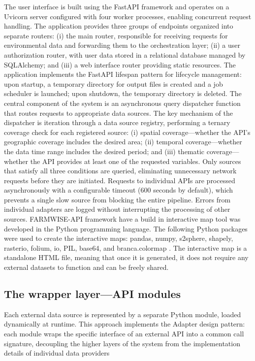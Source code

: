 \documentclass[preprint,12pt,authoryear]{elsarticle}
\begin{document}
The user interface is built using the FastAPI framework and operates on a Uvicorn server configured with four worker processes, enabling concurrent request handling. The application provides three groups of endpoints organized into separate routers: (i) the main router, responsible for receiving requests for environmental data and forwarding them to the orchestration layer; (ii) a user authorization router, with user data stored in a relational database managed by SQLAlchemy; and (iii) a web interface router providing static resources. The application implements the FastAPI lifespan pattern for lifecycle management: upon startup, a temporary directory for output files is created and a job scheduler is launched; upon shutdown, the temporary directory is deleted.
The central component of the system is an asynchronous query dispatcher function that routes requests to appropriate data sources. The key mechanism of the dispatcher is iteration through a data source registry, performing a ternary coverage check for each registered source: (i) spatial coverage—whether the API's geographic coverage includes the desired area; (ii) temporal coverage—whether the data time range includes the desired period; and (iii) thematic coverage—whether the API provides at least one of the requested variables. Only sources that satisfy all three conditions are queried, eliminating unnecessary network requests before they are initiated. Requests to individual APIs are processed asynchronously with a configurable timeout (600 seconds by default), which prevents a single slow source from blocking the entire pipeline. Errors from individual adapters are logged without interrupting the processing of other sources.
FARMWISE-API framework have a build in interactive map tool was developed in the Python programming language. The following Python packages were used to create the interactive maps: pandas, numpy, s2sphere, shapely, rasterio, folium, io, PIL, base64, and branca.colormap \citep{foliumteam2025,Gillies2025,pandasdevelopmentteam2024,Rougier2015,s2spheredevelopmentteam2025, Rasteriodevelopmentteam2025,PythonTeam2025}. The interactive map is a standalone HTML file, meaning that once it is generated, it does not require any external datasets to function and can be freely shared.

\subsection{The wrapper layer—API modules}
\label{Meth:sub1}

Each external data source is represented by a separate Python module, loaded dynamically at runtime. This approach implements the Adapter design pattern: each module wraps the specific interface of an external API into a common call signature, decoupling the higher layers of the system from the implementation details of individual data providers 
\end{document}
